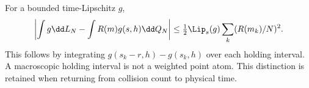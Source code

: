 For a bounded time-Lipschitz $g$,
\[
 \left|\int g\dd L_N-\int R(m)g(s,h)\dd Q_N\right|
 \le\tfrac12\Lip_s(g)\sum_k(R(m_k)/N)^2.
\]
This follows by integrating $g(s_k-r,h)-g(s_k,h)$ over each holding interval. A macroscopic holding interval is not a weighted point atom. This distinction is retained when returning from collision count to physical time.
\par
